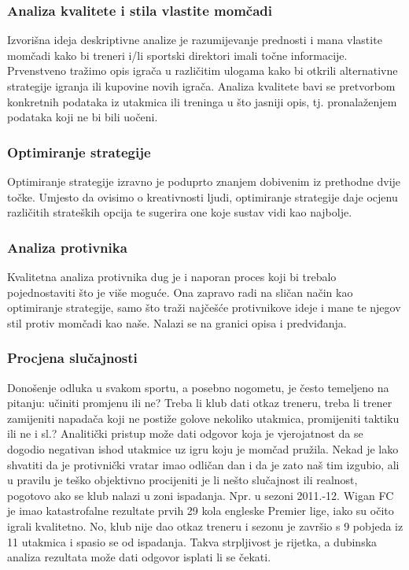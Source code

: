 \documentclass{ferseminar}
\begin{document}
\subsubsection{Analiza kvalitete i stila vlastite momčadi}
Izvorišna ideja deskriptivne analize je razumijevanje prednosti i mana vlastite momčadi kako bi treneri i/li sportski direktori imali točne informacije. Prvenstveno tražimo opis igrača u različitim ulogama kako bi otkrili alternativne strategije igranja ili kupovine novih igrača. Analiza kvalitete bavi se pretvorbom konkretnih podataka iz utakmica ili treninga u što jasniji opis, tj. pronalaženjem podataka koji ne bi bili uočeni.

\subsubsection{Optimiranje strategije}
Optimiranje strategije izravno je poduprto znanjem dobivenim iz prethodne dvije točke. Umjesto da ovisimo o kreativnosti ljudi, optimiranje strategije daje ocjenu različitih strateških opcija te sugerira one koje sustav vidi kao najbolje.

\subsubsection{Analiza protivnika}
Kvalitetna analiza protivnika dug je i naporan proces koji bi trebalo pojednostaviti što je više moguće. Ona zapravo radi na sličan način kao optimiranje strategije, samo što traži najčešće protivnikove ideje i mane te njegov stil protiv momčadi kao naše. Nalazi se na granici opisa i predviđanja.

\subsubsection{Procjena slučajnosti}
Donošenje odluka u svakom sportu, a posebno nogometu, je često temeljeno na pitanju: učiniti promjenu ili ne? Treba li klub dati otkaz treneru, treba li trener zamijeniti napadača koji ne postiže golove nekoliko utakmica, promijeniti taktiku ili ne i sl.? Analitički pristup može dati odgovor koja je vjerojatnost da se dogodio negativan ishod utakmice uz igru koju je momčad pružila. Nekad je lako shvatiti da je protivnički vratar imao odličan dan i da je zato naš tim izgubio, ali u pravilu je teško objektivno procijeniti je li nešto slučajnost ili realnost, pogotovo ako se klub nalazi u zoni ispadanja. Npr. u sezoni 2011.-12. Wigan FC je imao katastrofalne rezultate prvih 29 kola engleske Premier lige, iako su očito igrali kvalitetno. No, klub nije dao otkaz treneru i sezonu je završio s 9 pobjeda iz 11 utakmica i spasio se od ispadanja. Takva strpljivost je rijetka, a dubinska analiza rezultata može dati odgovor isplati li se čekati.
\end{document}
